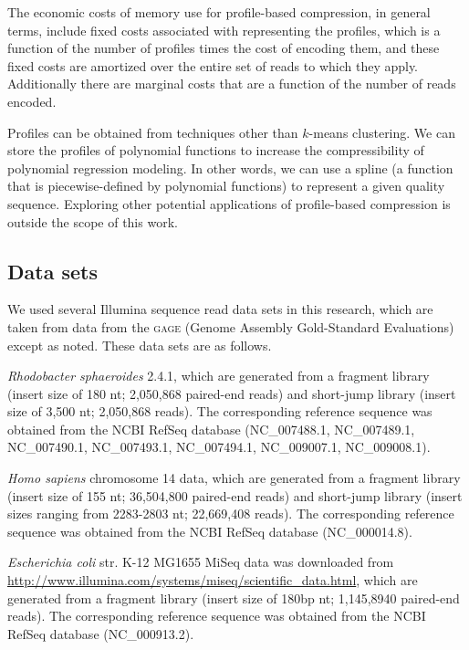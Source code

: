 \documentclass{bioinfo}
\begin{document}
\begin{methods}
The economic costs of memory use for profile-based compression, in
general terms, include fixed costs associated with representing the
profiles, which is a function of the number of profiles times the cost
of encoding them, and these fixed costs are amortized over the entire
set of reads to which they apply. Additionally there are marginal
costs that are a function of the number of reads encoded.

Profiles can be obtained from techniques other than $k$-means clustering.
We can store the profiles of polynomial functions to increase the compressibility of polynomial regression modeling.
In other words, we can use a spline (a function that is piecewise-defined by polynomial functions) to represent a given quality sequence.
Exploring other potential applications of profile-based compression is outside the scope of this work.

\subsection{Data sets}

We used several Illumina sequence read data sets in this research,
which are taken from data from the \textsc{gage} (Genome Assembly
Gold-Standard Evaluations)~\citep{Salzberg:2012rc} except as
noted. These data sets are as follows.

\textit{Rhodobacter sphaeroides} 2.4.1, which are generated from a
fragment library (insert size of 180 nt; 2,050,868 paired-end reads)
and short-jump library (insert size of 3,500 nt; 2,050,868 reads). The
corresponding reference sequence was obtained from the NCBI RefSeq
database (NC\_007488.1, NC\_007489.1, NC\_007490.1, NC\_007493.1,
NC\_007494.1, NC\_009007.1, NC\_009008.1).

\textit{Homo sapiens} chromosome 14 data, which are generated from a
fragment library (insert size of 155 nt; 36,504,800 paired-end reads)
and short-jump library (insert sizes ranging from 2283-2803 nt;
22,669,408 reads). The corresponding reference sequence was obtained
from the NCBI RefSeq database (NC\_000014.8).

\textit{Escherichia coli} str. K-12 MG1655 MiSeq data was downloaded
from \url{http://www.illumina.com/systems/miseq/scientific_data.html},
which are generated from a fragment library (insert size of 180bp nt;
1,145,8940 paired-end reads). The corresponding reference sequence was
obtained from the NCBI RefSeq database (NC\_000913.2).


\end{methods}
\end{document}
